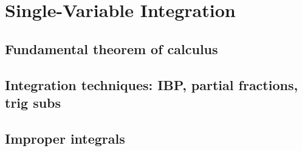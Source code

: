 
\section{Single-Variable Integration}

\subsection{Fundamental theorem of calculus}


\subsection{Integration techniques: IBP, partial fractions, trig subs}


\subsection{Improper integrals}

